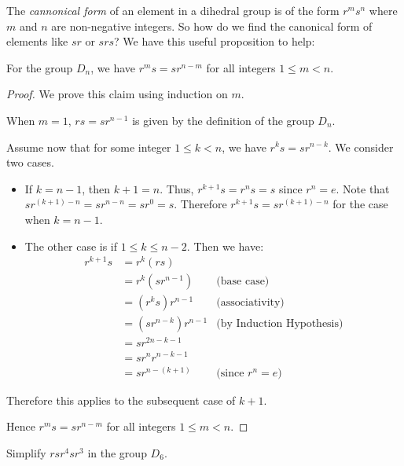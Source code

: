 The \textit{cannonical form} of an element in a dihedral group is of the form $r^ms^n$ where $m$ and $n$ are non-negative integers. So how do we find the canonical form of elements like $sr$ or $srs$? We have this useful proposition to help:
\begin{proposition}
    For the group $D_n$, we have $r^ms = sr^{n-m}$ for all integers $1 \leq m < n$.
\end{proposition}
\begin{proof}
    We prove this claim using induction on $m$.

    When $m = 1$, $rs = sr^{n-1}$ is given by the definition of the group $D_n$.

    Assume now that for some integer $1 \leq k < n$, we have $r^ks = sr^{n-k}$. We consider two cases.
    \begin{itemize}
        \item If $k = n - 1$, then $k + 1 = n$. Thus, $r^{k+1}s = r^ns = s$ since $r^n = e$. Note that $sr^{(k+1)-n} = sr^{n-n} = sr^0 = s$. Therefore $r^{k+1}s = sr^{(k+1)-n}$ for the case when $k = n - 1$.
        \item The other case is if $1 \leq k \leq n - 2$. Then we have:
        \begin{align*}
            r^{k+1}s &= r^k(rs)\\
            &= r^k(sr^{n-1}) & \text{(base case)}\\
            &= (r^ks)r^{n-1} & \text{(associativity)}\\
            &= (sr^{n-k})r^{n-1} & \text{(by Induction Hypothesis)}\\
            &= sr^{2n - k - 1}\\
            &= sr^nr^{n-k-1}\\
            &= sr^{n-(k+1)} & \text{(since } r^n = e \text{)}
        \end{align*}
    \end{itemize}
    Therefore this applies to the subsequent case of $k+1$.

    Hence $r^ms = sr^{n-m}$ for all integers $1 \leq m < n$.
\end{proof}

\begin{exercise}
    Simplify $rsr^4sr^3$ in the group $D_6$.
\end{exercise}

\newpage

